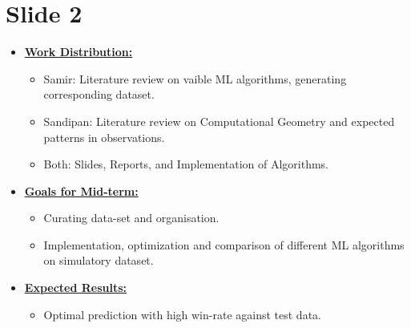 \documentclass[10pt, xcolor=x11names,compress]{beamer}
\begin{document}
\section{Slide 2}
\begin{frame}{}
\begin{itemize}
    \item \underline{\textbf{Work Distribution:}}
    \begin{itemize}
        \item{Samir:} Literature review on vaible ML algorithms, generating corresponding dataset.
        \item{Sandipan:} Literature review on Computational Geometry and expected patterns in observations.
        \item{Both:} Slides, Reports, and Implementation of Algorithms.
    \end{itemize}
    \item \underline{\textbf{Goals for Mid-term:}}
    \begin{itemize}
        \item Curating data-set and organisation.
        \item Implementation, optimization and comparison of different ML algorithms on simulatory dataset.
    \end{itemize}
        \item \underline{\textbf{Expected Results:}}
    \begin{itemize}
        \item Optimal prediction with high win-rate against test data.
    \end{itemize}
\end{itemize}

\end{frame}
\end{document}
